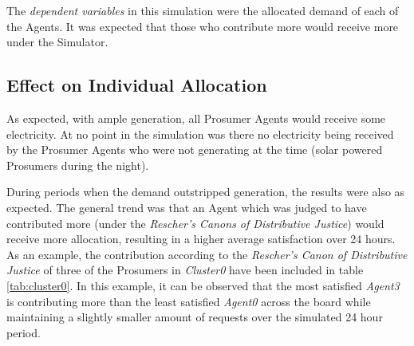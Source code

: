 The \textit{dependent variables} in this simulation were the allocated demand of each of the Agents. It was expected that those who contribute more would receive more under the Simulator.

\subsection*{Effect on Individual Allocation}
As expected, with ample generation, all Prosumer Agents would receive some electricity. At no point in the simulation was there no electricity being received by the Prosumer Agents who were not generating at the time (solar powered Prosumers during the night). 

During periods when the demand outstripped generation, the results were also as expected. The general trend was that an Agent which was judged to have contributed more (under the \textit{Rescher's Canons of Distributive Justice}) would receive more allocation, resulting in a higher average satisfaction over 24 hours. As an example, the contribution according to the \textit{Rescher's Canon of Distributive Justice} of three of the Prosumers in \textit{Cluster0} have been included in table \ref{tab:cluster0}. In this example, it can be observed that the most satisfied \textit{Agent3} is contributing more than the least satisfied \textit{Agent0} across the board while maintaining a slightly smaller amount of requests over the simulated 24 hour period. 

